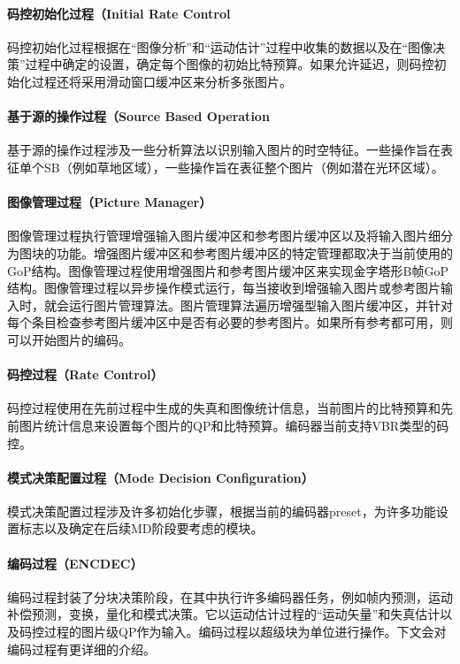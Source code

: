   \paragraph{码控初始化过程（Initial Rate Control} 码控初始化过程根据在“图像分析”和“运动估计”过程中收集的数据以及在“图像决策”过程中确定的设置，确定每个图像的初始比特预算。如果允许延迟，则码控初始化过程还将采用滑动窗口缓冲区来分析多张图片。

  \paragraph{基于源的操作过程（Source Based Operation} 基于源的操作过程涉及一些分析算法以识别输入图片的时空特征。一些操作旨在表征单个SB（例如草地区域），一些操作旨在表征整个图片（例如潜在光环区域）。

  \paragraph{图像管理过程（Picture Manager）} 图像管理过程执行管理增强输入图片缓冲区和参考图片缓冲区以及将输入图片细分为图块的功能。增强图片缓冲区和参考图片缓冲区的特定管理都取决于当前使用的GoP结构。图像管理过程使用增强图片和参考图片缓冲区来实现金字塔形B帧GoP结构。图像管理过程以异步操作模式运行，每当接收到增强输入图片或参考图片输入时，就会运行图片管理算法。图片管理算法遍历增强型输入图片缓冲区，并针对每个条目检查参考图片缓冲区中是否有必要的参考图片。如果所有参考都可用，则可以开始图片的编码。

  \paragraph{码控过程（Rate Control）} 码控过程使用在先前过程中生成的失真和图像统计信息，当前图片的比特预算和先前图片统计信息来设置每个图片的QP和比特预算。编码器当前支持VBR类型的码控。

  \paragraph{模式决策配置过程（Mode Decision Configuration）} 模式决策配置过程涉及许多初始化步骤，根据当前的编码器preset，为许多功能设置标志以及确定在后续MD阶段要考虑的模块。

  \paragraph{编码过程（ENCDEC）} 编码过程封装了分块决策阶段，在其中执行许多编码器任务，例如帧内预测，​​运动补偿预测，变换，量化和模式决策。它以运动估计过程的“运动矢量”和失真估计以及码控过程的图片级QP作为输入。编码过程以超级块为单位进行操作。下文会对编码过程有更详细的介绍。


